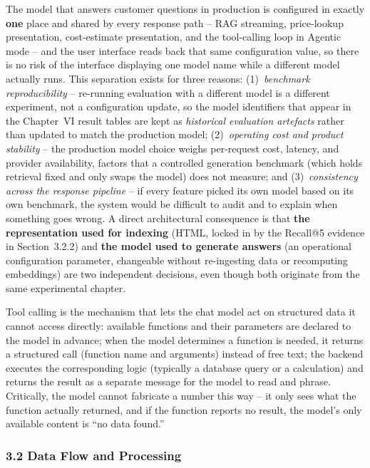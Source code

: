 \documentclass[11pt,a4paper]{article}
\begin{document}
The model that answers customer questions in production is configured in
exactly \textbf{one} place and shared by every response path -- RAG
streaming, price-lookup presentation, cost-estimate presentation, and the
tool-calling loop in Agentic mode -- and the user interface reads back that
same configuration value, so there is no risk of the interface displaying
one model name while a different model actually runs. This separation exists
for three reasons: (1)~\emph{benchmark reproducibility} -- re-running
evaluation with a different model is a different experiment, not a
configuration update, so the model identifiers that appear in the Chapter~VI
result tables are kept as \emph{historical evaluation artefacts} rather than
updated to match the production model; (2)~\emph{operating cost and product
stability} -- the production model choice weighs per-request cost, latency,
and provider availability, factors that a controlled generation benchmark
(which holds retrieval fixed and only swaps the model) does not measure; and
(3)~\emph{consistency across the response pipeline} -- if every feature
picked its own model based on its own benchmark, the system would be
difficult to audit and to explain when something goes wrong. A direct
architectural consequence is that \textbf{the representation used for
indexing} (HTML, locked in by the Recall@5 evidence in Section~3.2.2) and
\textbf{the model used to generate answers} (an operational configuration
parameter, changeable without re-ingesting data or recomputing embeddings)
are two independent decisions, even though both originate from the same
experimental chapter.

Tool calling is the mechanism that lets the chat model act on structured
data it cannot access directly: available functions and their parameters are
declared to the model in advance; when the model determines a function is
needed, it returns a structured call (function name and arguments) instead
of free text; the backend executes the corresponding logic (typically a
database query or a calculation) and returns the result as a separate
message for the model to read and phrase. Critically, the model cannot
fabricate a number this way -- it only sees what the function actually
returned, and if the function reports no result, the model's only available
content is ``no data found.''

\subsubsection{3.2 Data Flow and Processing}
\end{document}
